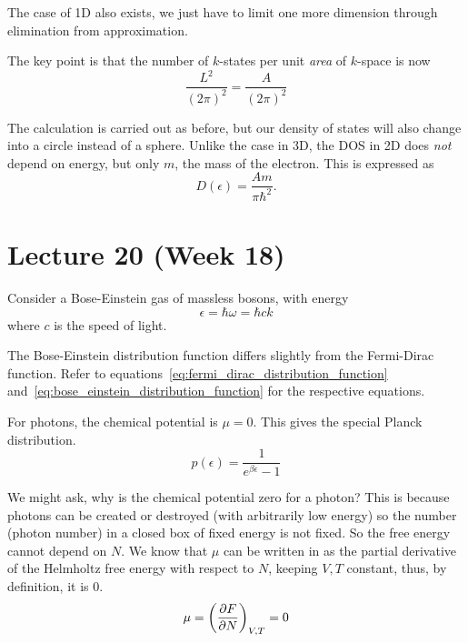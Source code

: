 \documentclass[12pt,chapterprefix=false,dvipsnames]{scrbook}
\theoremstyle{dotless}
\theoremstyle{definition}
\begin{document}
The case of 1D also exists, we just have to limit one more
dimension through elimination from approximation.

The key point is that the number of
$k$-states per unit \textit{area}
of $k$-space is now
\begin{equation}
	\frac{L^2}{{\left(2\pi\right)}^2}
	=
	\frac{A}{{\left(2\pi\right)}^2}
\end{equation}

The calculation is carried out as before, but our density of
states will also change into a circle instead of a sphere.
Unlike the case in 3D, the DOS in 2D does
\textit{not} depend on energy, but only
$m$, the mass of the electron. This is
expressed as
\begin{equation}
	D\left(\epsilon\right) = \frac{Am}{\pi\hbar^2}.
\end{equation}

\chapter{Lecture 20 (Week 18)}%
\label{cha:lecture_20}%

Consider a Bose-Einstein gas of massless bosons, with energy
\begin{equation}
	\epsilon
	=
	\hbar\omega
	=
	\hbar ck
\end{equation}
where $c$ is the speed of light.

The Bose-Einstein distribution function differs slightly from
the Fermi-Dirac function. Refer to
equations~\ref{eq:fermi_dirac_distribution_function} and~\ref{eq:bose_einstein_distribution_function}
for the respective equations.

For photons, the chemical potential is $\mu = 0$.
This gives the special Planck distribution.
\begin{equation}
	\label{eq:plancks_distribution_function}%
	p\left(\epsilon\right) = \frac{1}{e^{\beta\epsilon} - 1}
\end{equation}

We might ask, why is the chemical potential zero for a photon?
This is because photons can be created or destroyed (with
arbitrarily low energy) so the number (photon number) in a
closed box of fixed energy is not fixed. So the free energy
cannot depend on $N$. We know that
$\mu$ can be written in as the partial
derivative of the Helmholtz free energy with respect to
$N$, keeping $V,T$
constant, thus, by definition, it is 0.
\begin{equation}
	\mu = {\left(\pdv{F}{N}\right)}_{V,T} = 0
\end{equation}
\end{document}
